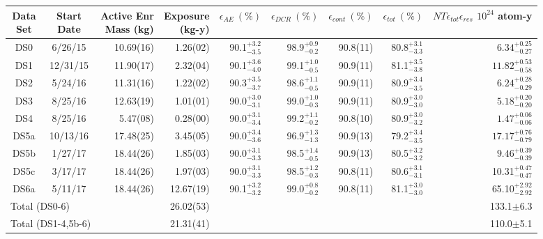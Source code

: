 \begin{tabular}{|cc|rr|rrrr|r|}
  \hline
  \makecell{Data\\Set} & \makecell{Start\\Date} & \makecell{Active Enr\\Mass (kg)} & \makecell{Exposure\\(kg-y)} & $\epsilon_{AE}~(\%)$ & $\epsilon_{DCR}~(\%)$ & $\epsilon_{cont}~(\%)$ & $\epsilon_{tot}~(\%)$ & \makecell{$N T \epsilon_{tot}\epsilon_{res}$\\$10^{24}$ atom-y} \\
  \hline
  DS0 & 6/26/15 & 10.69(16) & 1.26(02) & 90.1$_{-3.5}^{+3.2}$ & 98.9$_{-0.2}^{+0.9}$ & 90.8(11) & 80.8$_{-3.3}^{+3.1}$ & $6.34_{-0.27}^{+0.25}$ \\
  DS1 & 12/31/15 & 11.90(17) & 2.32(04) & 90.1$_{-4.0}^{+3.6}$ & 99.1$_{-0.5}^{+1.0}$& 90.9(11) & 81.1$_{-3.8}^{+3.5}$ & $11.82_{-0.58}^{+0.53}$ \\
  DS2 & 5/24/16 & 11.31(16) & 1.22(02) & 90.3$_{-3.7}^{+3.5}$ & 98.6$_{-0.5}^{+1.1}$& 90.9(11) & 80.9$_{-3.5}^{+3.4}$ & $6.24_{-0.29}^{+0.28}$ \\
  DS3 & 8/25/16 & 12.63(19) & 1.01(01) & 90.0$_{-3.1}^{+3.0}$ & 99.0$_{-0.3}^{+1.0}$ & 90.9(11) & 80.9$_{-3.0}^{+3.0}$ & $5.18_{-0.20}^{+0.20}$ \\
  DS4 & 8/25/16 & 5.47(08) & 0.28(00) & 90.0$_{-3.4}^{+3.1}$ & 99.2$_{-0.2}^{+1.1}$ & 90.8(10) & 80.9$_{-3.2}^{+3.0}$ & $1.47_{-0.06}^{+0.06}$ \\
  DS5a & 10/13/16 & 17.48(25) & 3.45(05) & 90.0$_{-3.6}^{+3.4}$ & 96.9$_{-1.3}^{+1.3}$ & 90.9(13) & 79.2$_{-3.5}^{+3.4}$ & $17.17_{-0.79}^{+0.76}$ \\
  DS5b & 1/27/17 & 18.44(26) & 1.85(03) & 90.0$_{-3.3}^{+3.1}$ & 98.5$_{-0.5}^{+1.4}$& 90.9(13) & 80.5$_{-3.2}^{+3.2}$ & $9.46_{-0.39}^{+0.39}$ \\
  DS5c & 3/17/17 &  18.44(26) & 1.97(03) & 90.0$_{-3.3}^{+3.1}$ & 98.5$_{-0.3}^{+1.2}$ & 90.8(11) & 80.6$_{-3.1}^{+3.1}$ &  10.31$_{-0.47}^{+0.47}$ \\
  DS6a & 5/11/17 &  18.44(26) & 12.67(19) & 90.1$_{-3.2}^{+3.2}$ & $99.0_{-0.2}^{+0.8}$ & 90.8(11) & 81.1$_{-3.0}^{+3.0}$ & 65.10$_{-2.92}^{+2.92}$ \\
  \hline
  \multicolumn{2}{|l|}{Total (DS0-6)} & & 26.02(53) & & & & & 133.1$\pm$6.3 \\
  \multicolumn{2}{|l|}{Total (DS1-4,5b-6)} & & 21.31(41) & & & & & 110.0$\pm$5.1 \\
  \hline
\end{tabular}
